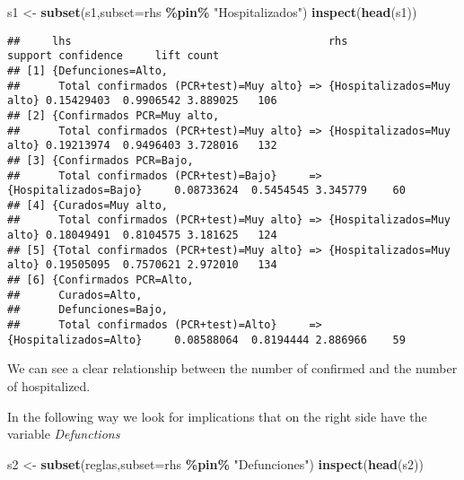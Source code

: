 \documentclass[
]{book}
\newenvironment{Shaded}{\begin{snugshade}}{\end{snugshade}}
\newcommand{\DataTypeTok}[1]{\textcolor[rgb]{0.13,0.29,0.53}{#1}}
\newcommand{\KeywordTok}[1]{\textcolor[rgb]{0.13,0.29,0.53}{\textbf{#1}}}
\newcommand{\NormalTok}[1]{#1}
\newcommand{\OperatorTok}[1]{\textcolor[rgb]{0.81,0.36,0.00}{\textbf{#1}}}
\newcommand{\StringTok}[1]{\textcolor[rgb]{0.31,0.60,0.02}{#1}}
\begin{document}
\begin{Shaded}
\begin{Highlighting}[]
\NormalTok{s1 \textless{}{-}}\StringTok{ }\KeywordTok{subset}\NormalTok{(s1,}\DataTypeTok{subset=}\NormalTok{rhs }\OperatorTok{\%pin\%}\StringTok{ "Hospitalizados"}\NormalTok{)}
\KeywordTok{inspect}\NormalTok{(}\KeywordTok{head}\NormalTok{(s1))}
\end{Highlighting}
\end{Shaded}

\begin{verbatim}
##     lhs                                        rhs                          support confidence     lift count
## [1] {Defunciones=Alto,                                                                                       
##      Total confirmados (PCR+test)=Muy alto} => {Hospitalizados=Muy alto} 0.15429403  0.9906542 3.889025   106
## [2] {Confirmados PCR=Muy alto,                                                                               
##      Total confirmados (PCR+test)=Muy alto} => {Hospitalizados=Muy alto} 0.19213974  0.9496403 3.728016   132
## [3] {Confirmados PCR=Bajo,                                                                                   
##      Total confirmados (PCR+test)=Bajo}     => {Hospitalizados=Bajo}     0.08733624  0.5454545 3.345779    60
## [4] {Curados=Muy alto,                                                                                       
##      Total confirmados (PCR+test)=Muy alto} => {Hospitalizados=Muy alto} 0.18049491  0.8104575 3.181625   124
## [5] {Total confirmados (PCR+test)=Muy alto} => {Hospitalizados=Muy alto} 0.19505095  0.7570621 2.972010   134
## [6] {Confirmados PCR=Alto,                                                                                   
##      Curados=Alto,                                                                                           
##      Defunciones=Bajo,                                                                                       
##      Total confirmados (PCR+test)=Alto}     => {Hospitalizados=Alto}     0.08588064  0.8194444 2.886966    59
\end{verbatim}

We can see a clear relationship between the number of confirmed and the number of hospitalized.

In the following way we look for implications that on the right side have the variable \emph{Defunctions}

\begin{Shaded}
\begin{Highlighting}[]
\NormalTok{s2 \textless{}{-}}\StringTok{ }\KeywordTok{subset}\NormalTok{(reglas,}\DataTypeTok{subset=}\NormalTok{rhs }\OperatorTok{\%pin\%}\StringTok{ "Defunciones"}\NormalTok{)}
\KeywordTok{inspect}\NormalTok{(}\KeywordTok{head}\NormalTok{(s2))}
\end{Highlighting}
\end{Shaded}
\end{document}
